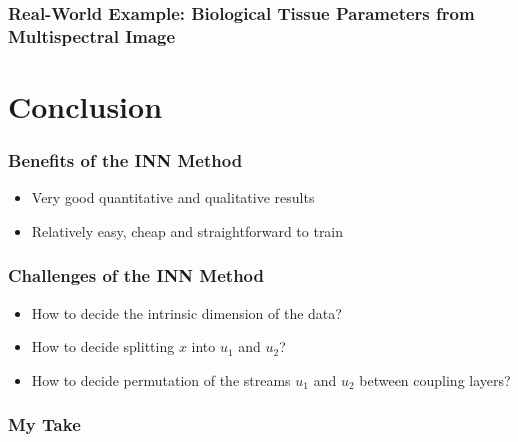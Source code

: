 \documentclass[aspectratio=43]{beamer}
\begin{document}
\begin{frame}
	\frametitle{Real-World Example: Biological Tissue Parameters from Multispectral Image}
	\begin{center}
	\end{center}
\end{frame}



\section{Conclusion}


\begin{frame}
	\frametitle{Benefits of the INN Method}
	\begin{itemize}
		\item Very good quantitative and qualitative results
		\item Relatively easy, cheap and straightforward to train
	\end{itemize}

\end{frame}


\begin{frame}
	\frametitle{Challenges of the INN Method}

	\begin{itemize}
		\item How to decide the intrinsic dimension of the data?
		\item How to decide splitting $x$ into $u_1$ and $u_2$?
		\item How to decide permutation of the streams $u_1$ and $u_2$ between coupling layers?
	\end{itemize}
\end{frame}

\begin{frame}
	\frametitle{My Take}
	\begin{center}
	\end{center}

\end{frame}
\end{document}
